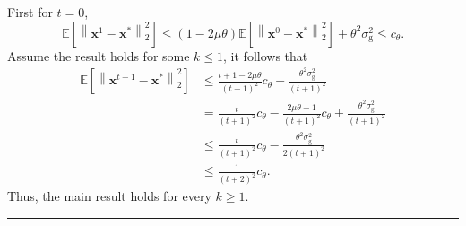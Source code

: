 \documentclass[12pt]{article}
\numberwithin{equation}{section}
\newenvironment{proof}{{\bf Proof:}}{\hfill\rule{2mm}{2mm}}
\begin{document}
\begin{proof}
$$	$$
	First for $t=0$,
	$$
	\mathbb{E}\left[\left\|\boldsymbol{x}^{1}-\boldsymbol{x}^{*}\right\|_{2}^{2}\right]\leq (1-2\mu\theta)\mathbb{E}\left[\left\|\boldsymbol{x}^{0}-\boldsymbol{x}^{*}\right\|_{2}^{2}\right]+\theta^2\sigma_{\mathrm{g}}^{2}\leq c_{\theta}.
	$$
	Assume the result holds for some $k\leq 1$, it follows that
	$$
	\begin{aligned}
	\mathbb{E}\left[\left\|\boldsymbol{x}^{t+1}-\boldsymbol{x}^{*}\right\|_{2}^{2}\right] &\leq\frac{t+1-2\mu\theta}{(t+1)^2}c_{\theta}+\frac{\theta^2\sigma_{\mathrm{g}}^{2}}{(t+1)^2}\\
	&=\frac{t}{(t+1)^2}c_{\theta}-\frac{2\mu\theta-1}{(t+1)^2}c_{\theta}+\frac{\theta^2\sigma_{\mathrm{g}}^{2}}{(t+1)^2}\\
	&\leq \frac{t}{(t+1)^2}c_{\theta}-\frac{\theta^2\sigma_{\mathrm{g}}^{2}}{2(t+1)^2}\\
	&\leq \frac{1}{(t+2)^2}c_{\theta}.
	\end{aligned}
	$$
	Thus, the main result holds for every $k\geq 1$.
\end{proof}
\end{document}
